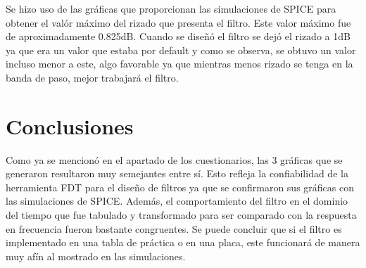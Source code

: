 \documentclass[12pt]{article}
\begin{document}
Se hizo uso de las gráficas que proporcionan las simulaciones de SPICE para obtener el valór máximo del rizado que presenta el filtro. Este valor máximo fue de aproximadamente 0.825dB. Cuando se diseñó el filtro se dejó el rizado a 1dB ya que era un valor que estaba por default y como se observa, se obtuvo un valor incluso menor a este, algo favorable ya que mientras menos rizado se tenga en la banda de paso, mejor trabajará el filtro.

\section{Conclusiones}
Como ya se mencionó en el apartado de los cuestionarios, las 3 gráficas que se generaron resultaron muy semejantes entre sí. Esto refleja la confiabilidad de la herramienta FDT para el diseño de filtros ya que se confirmaron sus gráficas con las simulaciones de SPICE. Además, el comportamiento del filtro en el dominio del tiempo que fue tabulado y transformado para ser comparado con la respuesta en frecuencia fueron bastante congruentes. Se puede concluir que si el filtro es implementado en una tabla de práctica o en una placa, este funcionará de manera muy afín al mostrado en las simulaciones. 
\end{document}
